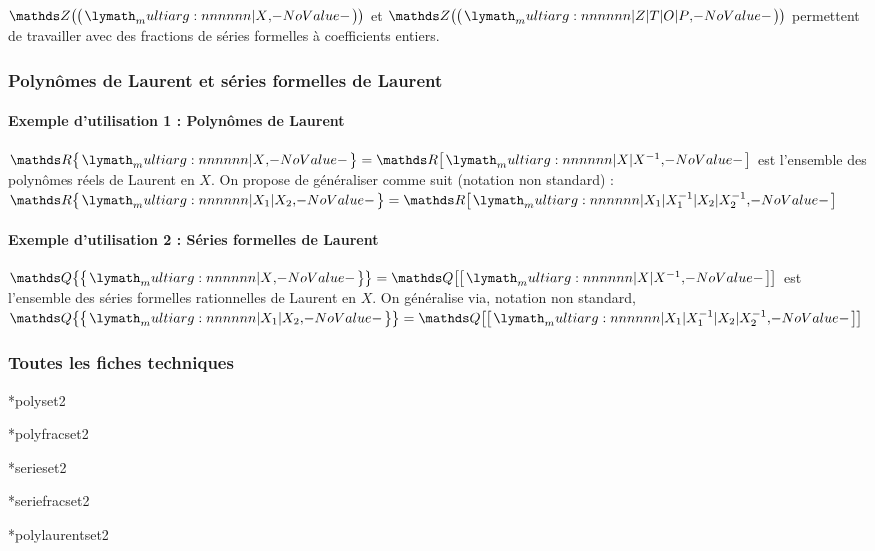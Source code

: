 \documentclass[12pt,a4paper]{article}
\makeatletter
\theoremstyle{definition}
\newcommand\IDmacro{\@ifstar{\@IDmacro@star}{\@IDmacro@no@star}}
\newcommand\@IDmacro@no@star[3]{%
    \texttt{%
    	\textbackslash#1 <macro>%
    	\IfStrEq{#2}{0}{}{%
    		\,\,[#2 Option%
				\IfStrEq{#2}{1}{}{s}]%
			}%
	    \IfStrEq{#3}{}{}{%
	    		\,\,(#3 Argument%
				\IfStrEq{#3}{1}{}{s})%
			}
	   	}
    \immediate\write\tempfile{macro,#1,#2,#3}%
}
\newcommand\@IDmacro@star[2]{%
    \@IDmacro@no@star{#1}{0}{#2}%
}
\makeatother
\begin{document}
\begin{tcblisting}{}
$\seriefracset{\ZZ}{X}$ et $\seriefracset{\ZZ}{Z | T | O | P}$ permettent de travailler
avec des fractions de séries formelles à coefficients entiers.
\end{tcblisting}



\subsubsection{Polynômes de Laurent et séries formelles de Laurent}

\paragraph{Exemple d'utilisation 1 : Polynômes de Laurent}

\begin{tcblisting}{}
$\polylaurentset{\RR}{X} = \polyset{\RR}{X | X^{-1}}$ est l'ensemble des polynômes
réels de Laurent en $X$. On propose de généraliser comme suit (notation non standard) :
$\polylaurentset{\RR}{X_1 | X_2} = \polyset{\RR}{X_1 | X_1^{-1} | X_2 | X_2^{-1}}$
\end{tcblisting}



\paragraph{Exemple d'utilisation 2 : Séries formelles de Laurent}

\begin{tcblisting}{}
$\serielaurentset{\QQ}{X} = \serieset{\QQ}{X | X^{-1}}$ est l'ensemble des séries
formelles rationnelles de Laurent en $X$. On généralise via, notation non standard,
$\serielaurentset{\QQ}{X_1 | X_2} = \serieset{\QQ}{X_1 | X_1^{-1} | X_2 | X_2^{-1}}$
\end{tcblisting}



\subsubsection{Toutes les fiches techniques}

\IDmacro*{polyset}{2}

\IDmacro*{polyfracset}{2}

\IDmacro*{serieset}{2}

\IDmacro*{seriefracset}{2}

\IDmacro*{polylaurentset}{2}
\end{document}
